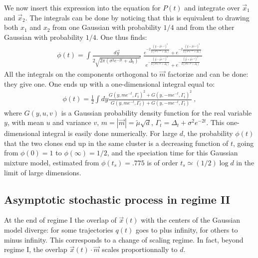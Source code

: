 \documentclass[10pt,twocolumn]{article}
\newcommand{\vm}{\vec m}
\begin{document}
We now insert this expression into the equation for $P(t)$ and integrate over $\vec x_1$ and $\vec x_2$. The integrals can be done by noticing that this is equivalent to drawing both $x_1$ and $x_2$ from one Gaussian with probability $1/4$ and from the other Gaussian with probability $1/4$. One thus finds:
\begin{align}
\phi(t)=\int \frac{d\vec y}{2\sqrt{2\pi(\sigma^2 e^{-2t}+\Delta_t)}^d}\; 
 \frac{
e^{-2\frac{(\vec y -\vec \mu e^{-t})^2}{2(\sigma^2 e^{-2t}+\Delta_t)}}
+
e^{-2\frac{(\vec y +\vec \mu e^{-t})^2}{2(\sigma^2 e^{-2t}+\Delta_t)}}
}{
e^{-\frac{(\vec y -\vec \mu e^{-t})^2}{2(\sigma^2 e^{-2t}+\Delta_t)}}+
e^{-\frac{(\vec y +\vec \mu e^{-t})^2}{2(\sigma^2 e^{-2t}+\Delta_t)}}
}
\end{align}
All the integrals on the components orthogonal to $\vm$ factorize and can be done: they give one. One ends up with a one-dimensional integral equal to:
\begin{align}
\phi(t)=\frac{1}{2} \int dy \frac{G(y,m e^{-t},\Gamma_t)^2+G(y,-m e^{-t},\Gamma_t)^2 }{G(y,m e^{-t},\Gamma_t)+G(y,-m e^{-t},\Gamma_t)}\ ,
\end{align}
where $G(y,u,v)$ is a Gaussian probability density function for the real variable $y$, with mean  $u$ and variance $v$, $m=|\vec m|=\tilde \mu \sqrt{d}$, $\Gamma_t= \Delta_t+\sigma^2 e^{-2t}$. This  one-dimensional integral is easily done numerically. For large $d$, the probability $\phi(t)$
that the two clones end up in the same cluster is a decreasing function of $t$, going from $\phi(0)=1$ to $\phi(\infty)=1/2$, and the speciation time for this Gaussian mixture model, estimated from $\phi (t_s)=.775$ is of order $t_s\simeq (1/2)\log d$ in the limit of large dimensions.

\subsection{Asymptotic stochastic process in regime II}
At the end of regime I the overlap of $\vec{x}(t)$ with the centers of the Gaussian model diverge: for some trajectories $q(t)$ goes to plus infinity, for others to minus infinity. This corresponds to a change of scaling regime. In fact, beyond regime I, the overlap $\vec{x}(t)\cdot \vec{m}$ scales proportionnally to $d$. 
\end{document}
